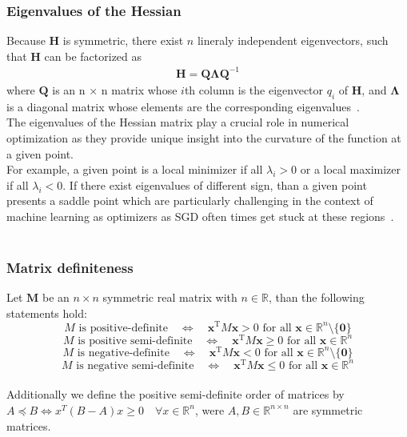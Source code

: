 \subsubsection{Eigenvalues of the Hessian}
Because \( \mathbf{H} \) is symmetric, there exist $n$ lineraly independent eigenvectors,
such that \( \mathbf{H} \) can be factorized as
\begin{align}
    \mathbf{H} =  \mathbf{Q} \mathbf{\Lambda} \mathbf{Q}^{-1}
\end{align}
where $\mathbf{Q} $ is an n × n matrix whose $i$th column is the eigenvector $q_i$ of $ \mathbf{H}$, and $\mathbf{\Lambda}$ is a diagonal matrix whose elements are the corresponding eigenvalues~\cite{kashyap2023survey}.\\
The eigenvalues of the Hessian matrix play a crucial role in numerical optimization as they provide unique insight into the curvature of the function at a given point.\\
For example, a given point is a local minimizer if all $\lambda_i > 0$ or a local maximizer if all $\lambda_i < 0$. If there exist eigenvalues of
different sign, than a given point presents a saddle point which are particularly challenging in the context of machine learning as optimizers as SGD often times get stuck at these regions~\cite{bottou2018optimization}. \\\\
\subsubsection{Matrix definiteness}
\label{sec:matrix_definiteness}
Let $ \mathbf{M}$  be an $n \times n$ symmetric real matrix with  $n \in \mathbb{R}$, than the following statements hold:  
\[
M \text{ is positive-definite} \quad \iff \quad \mathbf{x}^{\operatorname{T}} M \mathbf{x} > 0 \text{ for all } \mathbf{x} \in \mathbb{R}^n \setminus \{ \mathbf{0} \}
\]
\[
M \text{ is positive semi-definite} \quad \iff \quad \mathbf{x}^{\operatorname{T}} M \mathbf{x} \geq 0 \text{ for all } \mathbf{x} \in \mathbb{R}^n
\]
\[
M \text{ is negative-definite} \quad \iff \quad \mathbf{x}^{\operatorname{T}} M \mathbf{x} < 0 \text{ for all } \mathbf{x} \in \mathbb{R}^n \setminus \{ \mathbf{0} \}
\]
\[
M \text{ is negative semi-definite} \quad \iff \quad \mathbf{x}^{\operatorname{T}} M \mathbf{x} \leq 0 \text{ for all } \mathbf{x} \in \mathbb{R}^n
\]\\
Additionally we define the positive semi-definite order of matrices by $A \preceq B \Longleftrightarrow x^T (B - A) x \geq 0 \quad \forall x \in \mathbb{R}^n$,
were $ A,B \in \mathbb{R}^{n \times n}$ are symmetric matrices.

